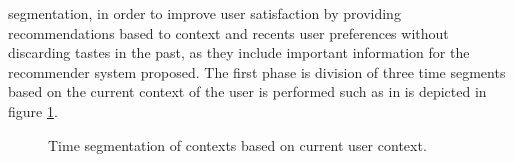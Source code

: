 segmentation, in order to improve user satisfaction by providing
recommendations based to context and recents user preferences without
discarding tastes in the past, as they include important information
for the recommender system proposed. The first phase is division of
three time segments based on the current context of the user is
performed such as in is depicted in figure \ref{fig:context-ml}.
\begin{figure}
	\captionsetup{justification=centering,margin=2cm}
	\centering
	\setlength\fboxsep{0pt}
	\caption{Time segmentation of contexts based on current user
		context.}
	\label{fig:context-ml}     
\end{figure}

